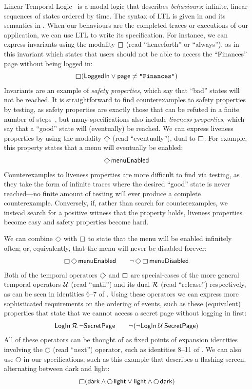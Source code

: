 \documentclass[sigplan,nonacm,10pt]{acmart}
\newcommand{\Next}{\operatorname{%
  \tikz[baseline]{
    \draw[line width=.12ex]
      (0,.6ex) circle (.8ex);
  }}}{}
\newcommand{\Eventually}{\operatorname{%
  \tikz[baseline]{
    \draw[line width=.12ex,line join=round]
      (0ex,.6ex) -- (.95ex,1.55ex) -- (1.9ex,.6ex) -- (.95ex,-.35ex) -- cycle;
  }}}{}
\newcommand{\Always}{\operatorname{%
  \tikz[baseline]{
    \draw[draw=white] (-0.2ex,0ex) -- (1.7ex,0ex);
    \draw[line width=.12ex,line join=round]
      (0ex,-.2ex) -- (0ex,1.3ex) -- (1.5ex,1.3ex) -- (1.5ex,.-.2ex) -- cycle;
  }}}{}
\newcommand{\Until}{\mathbin{%
  \mathcal{U}}}{}
\newcommand{\Release}{\mathbin{%
  \mathcal{R}}}{}
\begin{document}
 Linear Temporal Logic~\citep{ltl} is a modal logic that describes \emph{behaviours}: infinite, linear sequences of states ordered by time. The syntax of
 LTL is given in  and its semantics in . When our behaviours are the completed traces or executions of our application,
 we can use LTL to write its specification. For instance, we can express invariants using the modality $\Always$ (read ``henceforth'' or ``always''), as in this invariant which states that users should not be able to access the ``Finances'' page without being logged in:
 $$\Always (\mathsf{LoggedIn} \lor \mathsf{page} \neq \texttt{"Finances"})$$
 Invariants are an example of \emph{safety properties}, which say that ``bad'' states will not be reached. It is straightforward to find counterexamples to
 safety properties by testing, as safety properties are exactly those that can be refuted in a finite number of steps~\citep{alpernschneider},
 but many specifications also include
 \emph{liveness properties}, which say that a ``good'' state will (eventually) be reached. We can express liveness properties by using the modality $\Eventually$ (read ``eventually''), dual to $\Always$. For example, this property
 states that a menu will eventually be enabled:
 $$\Eventually \textsf{menuEnabled}$$
 Counterexamples to
 liveness properties are more difficult to find via testing, as they take the form of infinite traces where the desired ``good'' state is never reached---no finite amount of
 testing will ever produce a complete counterexample. Conversely, if, rather than search for counterexamples, we instead search for a positive witness that the property holds,
 liveness properties become easy and safety properties become hard.

 We can combine $\Eventually$ with $\Always$ to state that the menu will be enabled infinitely often; or, equivalently,
that the menu will never be disabled forever:
$$\Always \Eventually \textsf{menuEnabled}\qquad\neg\Eventually\Always\textsf{menuDisabled}$$
Both of the temporal operators $\Eventually$ and $\Always$ are special-cases of the more general temporal operators $\Until$ (read ``until'') and its dual $\Release$ (read ``release'') respectively, as can be
seen in identities 6--7 of . Using these operators we can express more sophisticated requirements on the
ordering of events, such as these (equivalent) properties that state that we cannot access a secret page without logging in first:
$$ \mathsf{LogIn}\Release\neg\mathsf{SecretPage}\quad\quad \neg(\neg \mathsf{LogIn} \Until \mathsf{SecretPage})$$
All of these operators can be thought of as fixed points of expansion identities involving the $\Next$ (read ``next'') operator, such
as identities 8--11 of . We can also use $\Next$ in our specifications, such as this example that describes a flashing
screen, alternating between dark and light:
$$ \Always (\mathsf{dark}\land \Next \mathsf{light} \lor \mathsf{light}\land \Next \mathsf{dark})$$
\end{document}
